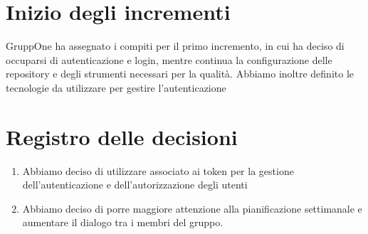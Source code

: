 \documentclass{article}
\begin{document}
\section{Inizio degli incrementi}%
\label{sec:inizio_incrementi}
GruppOne ha assegnato i compiti per il primo incremento, in cui ha deciso di occuparsi di autenticazione e login, mentre continua la configurazione delle repository e degli strumenti necessari per la qualità.
Abbiamo inoltre definito le tecnologie da utilizzare per gestire l'autenticazione
\newpage
\section{Registro delle decisioni}%
\label{sec:registro_delle_decisioni}

\begin{enumerate}
  \item Abbiamo deciso di utilizzare  associato ai token  per la gestione dell'autenticazione e dell'autorizzazione degli utenti
  \item Abbiamo deciso di porre maggiore attenzione alla pianificazione settimanale e aumentare il dialogo tra i membri del gruppo.
\end{enumerate}

\end{document}

